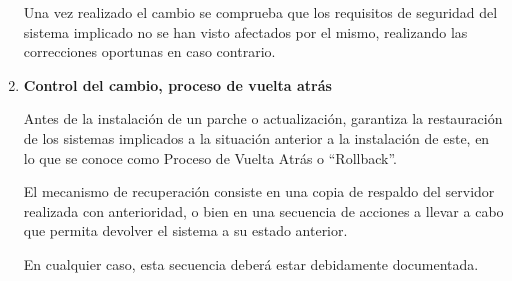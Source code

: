 \begin{enumerate}[label=\alph*)]
Una vez realizado el cambio se comprueba que los requisitos de seguridad del sistema implicado no se han visto afectados por el mismo, realizando las correcciones oportunas en caso contrario.

\item \textbf{Control del cambio, proceso de vuelta atrás}

Antes de la instalación de un parche o actualización, \Beneficiario{} garantiza la restauración de los sistemas implicados a la situación anterior a la instalación de este, en lo que se conoce como Proceso de Vuelta Atrás o “Rollback”.

El mecanismo de recuperación consiste en una copia de respaldo del servidor realizada con anterioridad, o bien en una secuencia de acciones a llevar a cabo que permita devolver el sistema a su estado anterior.

En cualquier caso, esta secuencia deberá estar debidamente documentada.

\end{enumerate}